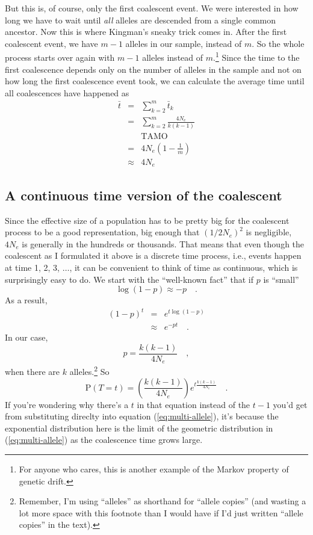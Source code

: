 \documentclass[12pt]{article}
\begin{document}
But this is, of course, only the first coalescent event. We were
interested in how long we have to wait until {\it all\/} alleles are
descended from a single common ancestor. Now this is where Kingman's
sneaky trick comes in. After the first coalescent event, we have $m-1$
alleles in our sample, instead of $m$. So the whole process starts
over again with $m-1$ alleles instead of $m$.\footnote{For anyone who
  cares, this is another example of the Markov property of genetic
  drift.} Since the time to the
first coalescence depends only on the number of alleles in the sample
and not on how long the first coalescence event took, we can calculate
the average time until all coalescences have happened
as
\begin{eqnarray*}
\bar t &=& \sum_{k=2}^m \bar t_k \\
       &=& \sum_{k=2}^m \frac{4N_e}{k(k-1)} \\
       && \mbox{TAMO} \\
       &=& 4N_e\left(1 - \frac{1}{m}\right) \\
       &\approx& 4N_e
\end{eqnarray*}

\subsection*{A continuous time version of the coalescent}

Since the effective size of a population has to be pretty big for the
coalescent process to be a good representation, big enough that
$(1/2N_e)^2$ is negligible, $4N_e$ is generally in the hundreds or
thousands. That means that even though the coalescent as I formulated
it above is a discrete time process, i.e., events happen at time 1, 2,
3, $\dots$, it can be convenient to think of time as continuous, which
is surprisingly easy to do. We start with the ``well-known fact'' that
if $p$ is ``small''
\[
\log(1-p) \approx -p \quad .
\]
As a result,
\begin{eqnarray*}
(1 - p)^t &=& e^{t \log(1-p)} \\
          &\approx& e^{-pt} \quad .
\end{eqnarray*}
In our case,
\[
p = \frac{k(k-1)}{4N_e} \quad ,
\]
when there are $k$ alleles.\footnote{Remember, I'm using ``alleles''
  as shorthand for ``allele copies'' (and wasting a lot more space
  with this footnote than I would have if I'd just written ``allele
  copies'' in the text).} So
\[
\mbox{P}(T = t) = \left(\frac{k(k-1)}{4N_e}\right)e^{t\frac{k(k-1)}{4N_e}} \quad .
\]
If you're wondering why there's a $t$ in that equation instead of the
$t-1$ you'd get from substituting direclty into equation
(\ref{eq:multi-allele}), it's because the exponential distribution
here is the limit of the geometric distribution in
(\ref{eq:multi-allele}) as the coalescence time grows large.
\end{document}
